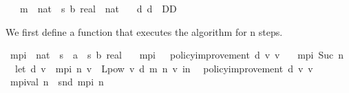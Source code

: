 \begin{isabellebody}
\ \ \ m\ {\isacharcolon}{\kern0pt}{\isacharcolon}{\kern0pt}\ {\isachardoublequoteopen}nat\ {\isasymRightarrow}\ {\isacharparenleft}{\kern0pt}{\isacharprime}{\kern0pt}s\ {\isasymRightarrow}\isactrlsub b\ real{\isacharparenright}{\kern0pt}\ {\isasymRightarrow}\ nat{\isachardoublequoteclose}\isanewline
\ \ \ d{}{\isacharcolon}{\kern0pt}\ {\isachardoublequoteopen}d{}\ {\isasymin}\ D\isactrlsub D{\isachardoublequoteclose}\isanewline
{}%
\begin{isamarkuptext}%
We first define a function that executes the algorithm for n steps.%
\end{isamarkuptext}\isamarkuptrue%
\isamarkupfalse%
\ mpi\ {\isacharcolon}{\kern0pt}{\isacharcolon}{\kern0pt}\ {\isachardoublequoteopen}nat\ {\isasymRightarrow}\ {\isacharparenleft}{\kern0pt}{\isacharparenleft}{\kern0pt}{\isacharprime}{\kern0pt}s\ {\isasymRightarrow}\ {\isacharprime}{\kern0pt}a{\isacharparenright}{\kern0pt}\ {\isasymtimes}\ {\isacharparenleft}{\kern0pt}{\isacharprime}{\kern0pt}s\ {\isasymRightarrow}\isactrlsub b\ real{\isacharparenright}{\kern0pt}{\isacharparenright}{\kern0pt}{\isachardoublequoteclose}\ \isanewline
\ \ {\isachardoublequoteopen}mpi\ {}\ {\isacharequal}{\kern0pt}\ {\isacharparenleft}{\kern0pt}policy{\isacharunderscore}{\kern0pt}improvement\ d{}\ v{}{\isacharcomma}{\kern0pt}\ v{}{\isacharparenright}{\kern0pt}{\isachardoublequoteclose}\ {\isacharbar}{\kern0pt}\isanewline
\ \ {\isachardoublequoteopen}mpi\ {\isacharparenleft}{\kern0pt}Suc\ n{\isacharparenright}{\kern0pt}\ {\isacharequal}{\kern0pt}\isanewline
\ \ {\isacharparenleft}{\kern0pt}let\ {\isacharparenleft}{\kern0pt}d{\isacharcomma}{\kern0pt}\ v{\isacharparenright}{\kern0pt}\ {\isacharequal}{\kern0pt}\ mpi\ n{\isacharsemicolon}{\kern0pt}\ v{\isacharprime}{\kern0pt}\ {\isacharequal}{\kern0pt}\ L{\isacharunderscore}{\kern0pt}pow\ v\ d\ {\isacharparenleft}{\kern0pt}m\ n\ v{\isacharparenright}{\kern0pt}\ in\isanewline
\ \ {\isacharparenleft}{\kern0pt}policy{\isacharunderscore}{\kern0pt}improvement\ d\ v{\isacharprime}{\kern0pt}{\isacharcomma}{\kern0pt}\ v{\isacharprime}{\kern0pt}{\isacharparenright}{\kern0pt}{\isacharparenright}{\kern0pt}{\isachardoublequoteclose}\isanewline
\isanewline
{}\isamarkupfalse%
\ {\isachardoublequoteopen}mpi{\isacharunderscore}{\kern0pt}val\ n\ {\isacharequal}{\kern0pt}\ snd\ {\isacharparenleft}{\kern0pt}mpi\ n{\isacharparenright}{\kern0pt}{\isachardoublequoteclose}\isanewline

\end{isabellebody}
